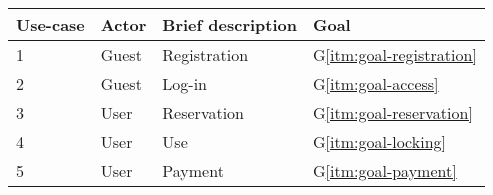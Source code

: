 \begin{center}
  \vspace{0.6cm}
  \begin{tabular}{|l|l|l|l|}
      \hline
      Use-case & Actor & Brief description & Goal \\\hline
      \hline
      1 & Guest & Registration & G\ref{itm:goal-registration} \\\hline
      2 & Guest & Log-in & G\ref{itm:goal-access} \\\hline
      3 & User & Reservation & G\ref{itm:goal-reservation} \\\hline
      4 & User & Use & G\ref{itm:goal-locking} \\\hline
      5 & User & Payment & G\ref{itm:goal-payment} \\\hline
  \end{tabular}
\end{center}
\begin{comment}
  \newpage
  \subsection{Sample section}
  This section is here just to provide a standard template for the system functions, before the functional requirements enumeration a brief description may be useful
  \subsubsection{Functional requirements}
  \subsubsection{Scenario 1}
  \subsubsection{Scenario 2}
  \subsubsection{Scenario n}
  \subsubsection{Use-case table}
  \subsubsection{Use-case diagram}
  \subsubsection{Activity/State-chart diagram}
  \subsubsection{Sequence diagram}
  \subsubsection{Mockups}
\end{comment}

